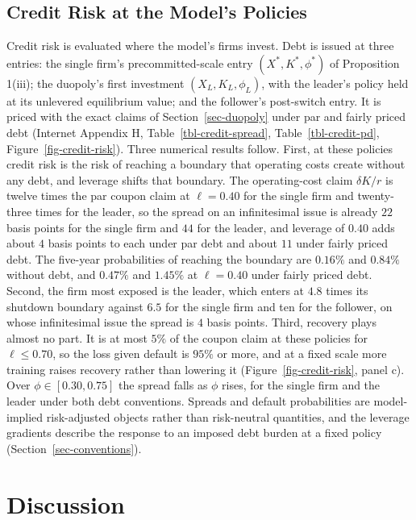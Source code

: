 \documentclass[
  11pt,
  letterpaper,
]{scrartcl}
\begin{document}
\subsection{Credit Risk at the Model's
Policies}\label{credit-risk-at-the-models-policies}

Credit risk is evaluated where the model's firms invest. Debt is issued
at three entries: the single firm's precommitted-scale entry
\((X^*, K^*, \phi^*)\) of Proposition 1(iii); the duopoly's first
investment \((X_L, K_L, \phi_L)\), with the leader's policy held at its
unlevered equilibrium value; and the follower's post-switch entry. It is
priced with the exact claims of Section~\ref{sec-duopoly} under par and
fairly priced debt (Internet Appendix H, Table~\ref{tbl-credit-spread},
Table~\ref{tbl-credit-pd}, Figure~\ref{fig-credit-risk}). Three
numerical results follow. First, at these policies credit risk is the
risk of reaching a boundary that operating costs create without any
debt, and leverage shifts that boundary. The operating-cost claim
\(\delta K/r\) is twelve times the par coupon claim at \(\ell = 0.40\)
for the single firm and twenty-three times for the leader, so the spread
on an infinitesimal issue is already \(22\) basis points for the single
firm and \(44\) for the leader, and leverage of \(0.40\) adds about
\(4\) basis points to each under par debt and about \(11\) under fairly
priced debt. The five-year probabilities of reaching the boundary are
\(0.16\%\) and \(0.84\%\) without debt, and \(0.47\%\) and \(1.45\%\) at
\(\ell = 0.40\) under fairly priced debt. Second, the firm most exposed
is the leader, which enters at \(4.8\) times its shutdown boundary
against \(6.5\) for the single firm and ten for the follower, on whose
infinitesimal issue the spread is \(4\) basis points. Third, recovery
plays almost no part. It is at most \(5\%\) of the coupon claim at these
policies for \(\ell \leq 0.70\), so the loss given default is \(95\%\)
or more, and at a fixed scale more training raises recovery rather than
lowering it (Figure~\ref{fig-credit-risk}, panel c). Over
\(\phi \in [0.30, 0.75]\) the spread falls as \(\phi\) rises, for the
single firm and the leader under both debt conventions. Spreads and
default probabilities are model-implied risk-adjusted objects rather
than risk-neutral quantities, and the leverage gradients describe the
response to an imposed debt burden at a fixed policy
(Section~\ref{sec-conventions}).

\section{Discussion}\label{sec-discussion}
\end{document}
